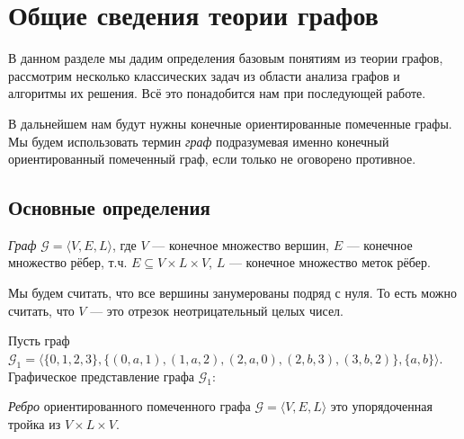 \section{Общие сведения теории графов}

В данном разделе мы дадим определения базовым понятиям из теории графов, рассмотрим несколько классических задач из области анализа графов и алгоритмы их решения.
Всё это понадобится нам при последующей работе.

В дальнейшем нам будут нужны конечные ориентированные помеченные графы.
Мы будем использовать термин \textit{граф} подразумевая именно конечный ориентированный помеченный граф, если только не оговорено противное.

\subsection{Основные определения}
\theoremstyle{definition}
\begin{definition}
  \textit{Граф} $\mathcal{G} = \langle V, E, L \rangle$, где $V$ --- конечное множество вершин, $E$ --- конечное множество рёбер, т.ч. $E \subseteq V \times L \times V$, $L$ --- конечное множество меток рёбер. 
\end{definition}

Мы будем считать, что все вершины занумерованы подряд с нуля.
То есть можно считать, что $V$ --- это отрезок неотрицательный целых чисел.

\begin{example}
  Пусть граф \\ $\mathcal{G}_1 = \langle \{0,1,2,3\}, \{(0,a,1), (1,a,2), (2,a,0), (2,b,3), (3,b,2)\}, \{a,b\} \rangle$.
  Графическое представление графа $\mathcal{G}_1$:
  \begin{center}
  \end{center}
\end{example}

\begin{definition}
  \textit{Ребро} ориентированного помеченного графа $\mathcal{G} = \langle V, E, L \rangle$ это упорядоченная тройка из $V \times L \times V$.
\end{definition}

